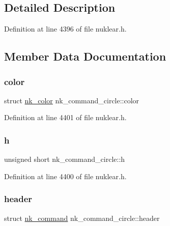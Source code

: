 \subsection{Detailed Description}


Definition at line 4396 of file nuklear.\+h.



\subsection{Member Data Documentation}
\mbox{\label{structnk__command__circle_aa9f19465515260dc83e60cab859cb040}} 
\subsubsection{\texorpdfstring{color}{color}}
{\footnotesize\ttfamily struct \mbox{\hyperlink{structnk__color}{nk\+\_\+color}} nk\+\_\+command\+\_\+circle\+::color}



Definition at line 4401 of file nuklear.\+h.

\mbox{\label{structnk__command__circle_a88c469119d31c7e7ea9c0b10814db875}} 
\subsubsection{\texorpdfstring{h}{h}}
{\footnotesize\ttfamily unsigned short nk\+\_\+command\+\_\+circle\+::h}



Definition at line 4400 of file nuklear.\+h.

\mbox{\label{structnk__command__circle_a30307deb035c1dccf43c849fd04a11f7}} 
\subsubsection{\texorpdfstring{header}{header}}
{\footnotesize\ttfamily struct \mbox{\hyperlink{structnk__command}{nk\+\_\+command}} nk\+\_\+command\+\_\+circle\+::header}



